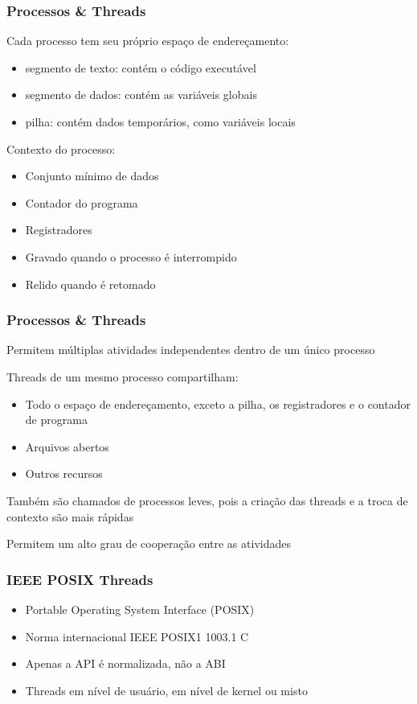 \documentclass[10pt, compress]{beamer}
\begin{document}
\begin{frame}
    \frametitle{Processos \& Threads}
    Cada processo tem seu próprio espaço de endereçamento:
        \begin{itemize}
            \item segmento de texto: contém o código executável
            \item segmento de dados: contém as variáveis globais
            \item pilha: contém dados temporários, como variáveis locais
        \end{itemize}

    Contexto do processo:
        \begin{itemize}
            \item Conjunto mínimo de dados
            \item Contador do programa
            \item Registradores
            \item Gravado quando o processo é interrompido
            \item Relido quando é retomado
        \end{itemize}
\end{frame}

\begin{frame}
    \frametitle{Processos \& Threads}
    Permitem múltiplas atividades independentes dentro de um
    único processo

    Threads de um mesmo processo compartilham:

    \begin{itemize}
        \item Todo o espaço de endereçamento, exceto a pilha, os
            registradores e o contador de programa
        \item Arquivos abertos
        \item Outros recursos
    \end{itemize}

    Também são chamados de processos leves, pois a criação das
    threads e a troca de contexto são mais rápidas

    Permitem um alto grau de cooperação entre as atividades
\end{frame}

\begin{frame}
    \frametitle{IEEE POSIX Threads}
    \begin{itemize}
        \item Portable Operating System Interface (\alert{POSIX})
        \item Norma internacional IEEE POSIX1 1003.1 C
        \item Apenas a API é normalizada, não a ABI
        \item Threads em nível de usuário, em nível de kernel ou misto
    \end{itemize}
\end{frame}
\end{document}

